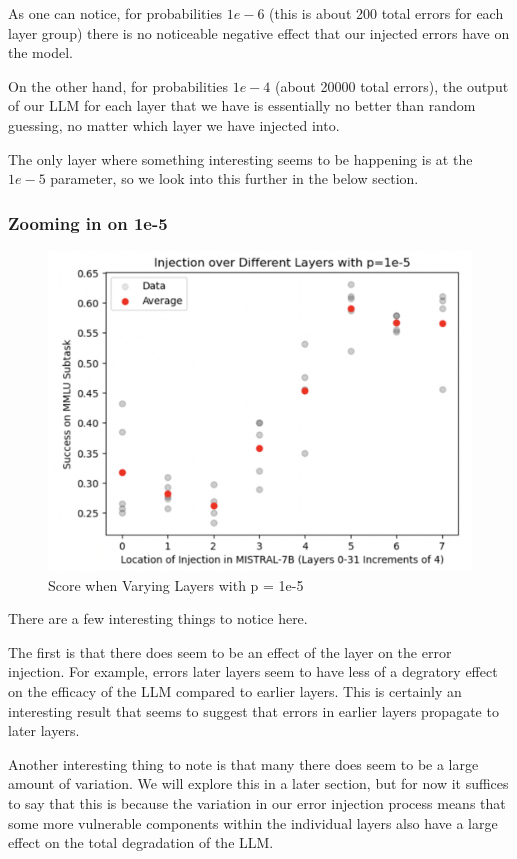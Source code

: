 As one can notice, for probabilities $1e-6$ (this is about 200 total errors for each layer group) there is no noticeable negative effect that our injected errors have on the model.

On the other hand, for probabilities $1e-4$ (about 20000 total errors), the output of our LLM for each layer that we have is essentially no better than random guessing, no matter which layer we have injected into.

The only layer where something interesting seems to be happening is at the $1e-5$ parameter, so we look into this further in the below section.

\subsubsection{Zooming in on 1e-5}

\begin{figure}[!htbp]
    \centering
    \includegraphics[width=1.0\linewidth]{images/varylayer.png}
    \caption{Score when Varying Layers with p = 1e-5}
    \label{fig:varylayer}
\end{figure}

There are a few interesting things to notice here.

The first is that there does seem to be an effect of the layer on the error injection. For example, errors later layers seem to have less of a degratory effect on the efficacy of the LLM compared to earlier layers.
This is certainly an interesting result that seems to suggest that errors in earlier layers propagate to later layers.

Another interesting thing to note is that many there does seem to be a large amount of variation. We will explore this in a later section, but for now it suffices to say that this is because the variation in our error injection process
means that some more vulnerable components within the individual layers also have a large effect on the total degradation of the LLM.




